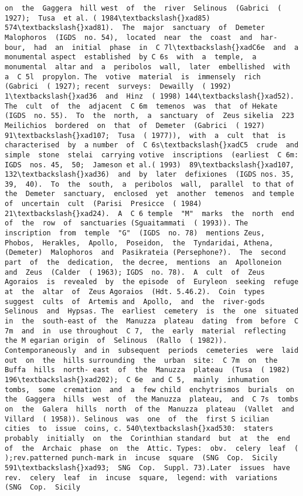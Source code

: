 \documentclass[11pt]{article}
\begin{document}
\begin{Verbatim}[commandchars=\\\{\}]
 on  the  Gaggera  hill west  of  the  river  Selinous  (Gabrici  ( 1927);  Tusa  et al. ( 1984\textbackslash{}xad85)  574\textbackslash{}xad81).  The  major  sanctuary  of  Demeter Malophoros  (IGDS  no. 54),  located  near  the  coast  and  har- bour,  had  an  initial  phase  in  C 7l\textbackslash{}xadC6e  and  a  monumental aspect  established  by C 6s  with  a  temple,  a  monumental  altar and  a  peribolos  wall,  later  embellished  with  a  C 5l  propylon. The  votive  material  is  immensely  rich  (Gabrici  ( 1927); recent  surveys:  Dewailly  ( 1992)  1\textbackslash{}xad36  and  Hinz  ( 1998) 144\textbackslash{}xad52).  The  cult  of  the  adjacent  C 6m  temenos  was  that  of Hekate  (IGDS  no. 55).  To  the  north,  a  sanctuary  of  Zeus sikelia  223 Meilichios  bordered  on  that  of  Demeter  (Gabrici  ( 1927) 91\textbackslash{}xad107;  Tusa  ( 1977)),  with  a  cult  that  is  characterised  by  a number  of  C 6s\textbackslash{}xadC5  crude  and  simple  stone  stelai  carrying votive  inscriptions  (earliest  C 6m:  IGDS  nos. 45,  50;  Jameson et al.( 1993)  89\textbackslash{}xad107,  132\textbackslash{}xad36)  and  by  later  defixiones  (IGDS nos. 35,  39,  40).  To  the  south,  a  peribolos  wall,  parallel  to that of  the  Demeter  sanctuary,  enclosed  yet  another  temenos  and temple  of  uncertain  cult  (Parisi  Presicce  ( 1984)  21\textbackslash{}xad24).  A  C 6 temple  "M"  marks  the  north  end  of  the  row  of  sanctuaries (Sguaitammati  ( 1993)). The  inscription  from  temple  "G"  (IGDS  no. 78)  mentions Zeus,  Phobos,  Herakles,  Apollo,  Poseidon,  the  Tyndaridai, Athena, (Demeter)  Malophoros  and  Pasikrateia (Persephone?).  The  second  part  of  the  dedication,  the decree,  mentions  an  Apolloneion  and  Zeus  (Calder  ( 1963); IGDS  no. 78).  A  cult  of  Zeus  Agoraios  is  revealed  by  the episode  of  Euryleon  seeking  refuge  at  the  altar  of  Zeus Agoraios  (Hdt. 5.46.2).  Coin  types  suggest  cults  of  Artemis and  Apollo,  and  the  river-gods  Selinous  and  Hypsas. The  earliest  cemetery  is  the  one  situated  in  the  south-east of  the  Manuzza  plateau  dating  from  before  C 7m  and  in  use throughout  C 7,  the  early  material  reflecting the M egarian origin  of  Selinous  (Rallo  ( 1982)).  Contemporaneously  and in  subsequent  periods  cemeteries  were  laid  out  on  the  hills surrounding  the  urban  site:  C 7m  on  the  Buffa  hills  north- east  of  the  Manuzza  plateau  (Tusa  ( 1982)  196\textbackslash{}xad202);  C 6e  and C 5,  mainly  inhumation  tombs,  some  cremation  and  a  few child  enchytrismos  burials  on  the  Gaggera  hills  west  of  the Manuzza  plateau,  and  C 7s  tombs  on  the  Galera  hills  north  of the  Manuzza  plateau  (Vallet  and  Villard  ( 1958)). Selinous  was  one  of  the  first S icilian  cities  to  issue  coins, c. 540\textbackslash{}xad530:  staters  probably  initially  on  the  Corinthian standard  but  at  the  end  of  the  Archaic  phase  on  the  Attic. Types:  obv.  celery  leaf  ( );rev.patterned punch-mark in  incuse  square  (SNG  Cop.  Sicily 591\textbackslash{}xad93;  SNG  Cop.  Suppl. 73).Later  issues  have  rev.  celery  leaf  in  incuse  square,  legend: with  variations  (SNG  Cop.  Sicily 
\end{Verbatim}
\end{document}
